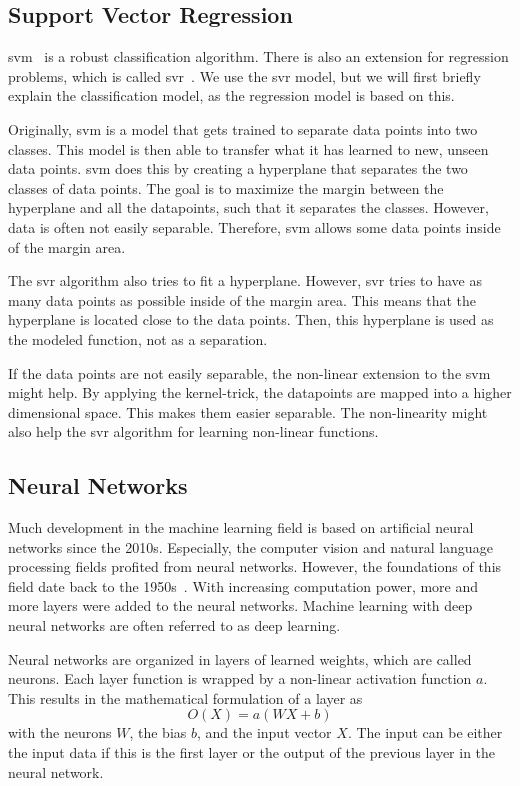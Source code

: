 \subsection{Support Vector Regression}
\label{sec:bg:svm}
\ac{svm}~\cite{cortes1995support} is a robust classification algorithm.
There is also an extension for regression problems, which is called \ac{svr}~\cite{drucker1997support}.
We use the \ac{svr} model, but we will first briefly explain the classification model, as the regression model is based on this.

Originally, \ac{svm} is a model that gets trained to separate data points into two classes.
This model is then able to transfer what it has learned to new, unseen data points.
\ac{svm} does this by creating a hyperplane that separates the two classes of data points.
The goal is to maximize the margin between the hyperplane and all the datapoints, such that it separates the classes.
However, data is often not easily separable.
Therefore, \ac{svm} allows some data points inside of the margin area.

The \ac{svr} algorithm also tries to fit a hyperplane.
However, \ac{svr} tries to have as many data points as possible inside of the margin area.
This means that the hyperplane is located close to the data points.
Then, this hyperplane is used as the modeled function, not as a separation.

If the data points are not easily separable, the non-linear extension to the \ac{svm} might help.
By applying the kernel-trick, the datapoints are mapped into a higher dimensional space.
This makes them easier separable.
The non-linearity might also help the \ac{svr} algorithm for learning non-linear functions.

\subsection{Neural Networks}
\label{sec:bg:nn}
Much development in the machine learning field is based on artificial neural networks since the 2010s.
Especially, the computer vision and natural language processing fields profited from neural networks.
However, the foundations of this field date back to the 1950s~\cite{rosenblatt1958perceptron}.
With increasing computation power, more and more layers were added to the neural networks.
Machine learning with deep neural networks are often referred to as deep learning.

Neural networks are organized in layers of learned weights, which are called neurons.
Each layer function is wrapped by a non-linear activation function $a$.
This results in the mathematical formulation of a layer as
\begin{equation}
    O(X) = a(WX+b)
\end{equation}
with the neurons $W$, the bias $b$, and the input vector $X$.
The input can be either the input data if this is the first layer or the output of the previous layer in the neural network.

